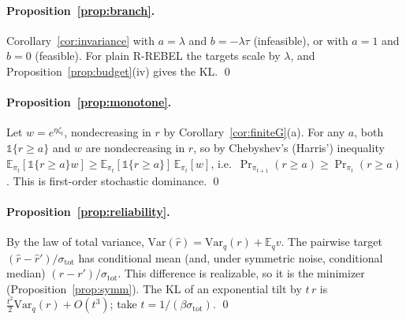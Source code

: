 \documentclass[11pt]{article}
\theoremstyle{definition}
\theoremstyle{remark}
\newcommand{\E}{\mathbb{E}}
\newcommand{\Var}{\mathrm{Var}}
\newcommand{\1}{\mathbb{1}}
\newcommand{\rr}{R-REBEL}
\begin{document}
\paragraph{Proposition~\ref{prop:branch}.} Corollary~\ref{cor:invariance} with
$a=\lambda$ and $b=-\lambda\tau$ (infeasible), or with $a=1$ and $b=0$ (feasible). For plain
\rr{} the targets scale by $\lambda$, and Proposition~\ref{prop:budget}(iv) gives the KL. \qed

\paragraph{Proposition~\ref{prop:monotone}.} Let $w=e^{\eta\zeta_t}$, nondecreasing in $r$
by Corollary~\ref{cor:finiteG}(a). For any $a$, both $\1\{r\ge a\}$ and $w$ are
nondecreasing in $r$, so by Chebyshev's (Harris') inequality
$\E_{\pi_t}[\1\{r\ge a\}w]\ge\E_{\pi_t}[\1\{r\ge a\}]\,\E_{\pi_t}[w]$, i.e.\
$\Pr_{\pi_{t+1}}(r\ge a)\ge\Pr_{\pi_t}(r\ge a)$. This is first-order stochastic dominance. \qed

\paragraph{Proposition~\ref{prop:reliability}.} By the law of total variance,
$\Var(\hat r)=\Var_q(r)+\E_qv$. The pairwise target
$(\hat r-\hat r')/\sigma_{\mathrm{tot}}$ has conditional mean (and, under symmetric noise,
conditional median) $(r-r')/\sigma_{\mathrm{tot}}$. This difference is realizable, so it is the
minimizer (Proposition~\ref{prop:symm}). The KL of an exponential tilt by $t\,r$ is
$\frac{t^2}{2}\Var_q(r)+O(t^3)$; take $t=1/(\beta\sigma_{\mathrm{tot}})$. \qed
\end{document}
